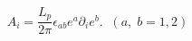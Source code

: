 \begin{equation}
A_i=\frac{L_p}{2\pi }\epsilon _{ab}e^a\partial _ie^b.\;\;(a,\;b=1,2)
\label{decomsec}
\end{equation}

